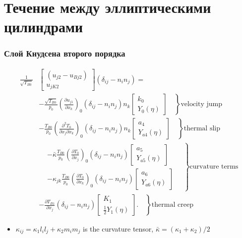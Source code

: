 \documentclass[mathserif]{beamer} %
\newcommand{\pder}[2][]{\frac{\partial#1}{\partial#2}}
\newcommand{\pderder}[3][]{\frac{\partial^2#1}{\partial#2\partial#3}}
\newcommand{\onwall}[1]{\left(#1\right)_0}
\newcommand{\deltann}[2]{(\delta_{#1#2}-n_#1 n_#2)}
\begin{document}
\section{Течение между эллиптическими цилиндрами}

\begin{frame}
    \frametitle{Слой Кнудсена второго порядка}
    \footnotesize
    \begin{equation*}
        \begin{aligned}
            \frac1{\sqrt{T_{B0}}}&
                \begin{bmatrix} (u_{j2} - u_{Bj2}) \\ u_{jK2} \end{bmatrix}\deltann{i}{j} = \\
            &- \left.\frac{\sqrt{T_{B0}}}{p_0}\onwall{\pder[u_{j1}]{x_k}} \deltann{i}{j}n_k
                \begin{bmatrix} k_0 \\ Y_0(\eta) \end{bmatrix} \quad\right\}\text{velocity jump}\\
            &- \left.\frac{T_{B0}}{p_0}\onwall{\pderder[T_0]{x_j}{x_k}} \deltann{i}{j}n_k
                \begin{bmatrix} a_4 \\ Y_{a4}(\eta) \end{bmatrix} \quad\right\}\text{thermal slip} \\
            &\left.\begin{aligned}
                &- \bar\kappa\frac{T_{B0}}{p_0}\onwall{\pder[T_0]{x_j}} \deltann{i}{j}
                \begin{bmatrix} a_5 \\ Y_{a5}(\eta) \end{bmatrix} \\
                &- \kappa_{jk}\frac{T_{B0}}{p_0}\onwall{\pder[T_0]{x_k}} \deltann{i}{j}
                \begin{bmatrix} a_6 \\ Y_{a6}(\eta) \end{bmatrix}
            \end{aligned} \quad\right\}\text{curvature terms}\\
            &- \left.\pder[T_{B1}]{x_j} \deltann{i}{j}
                \begin{bmatrix} K_1 \\ \frac12 Y_1(\eta) \end{bmatrix}. \quad\right\}\text{thermal creep}
        \end{aligned}\label{eq:boundary_u2t}
    \end{equation*}
    \vspace{-10pt}
    \begin{itemize}
        \item \(\kappa_{ij} = \kappa_1 l_i l_j + \kappa_2 m_i m_j\) is the curvature tensor, \(\bar\kappa = (\kappa_1+\kappa_2)/2\)
    \end{itemize}
\end{frame}
\end{document}
